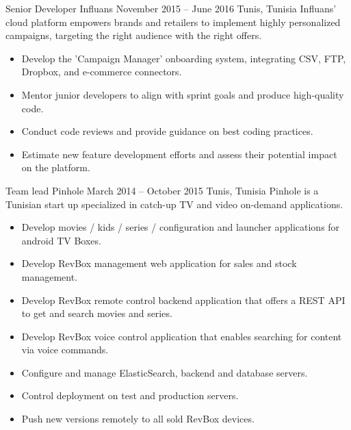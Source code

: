 \documentclass[10pt,a4paper]{resume-settings}
\begin{document}
\cvevent
    {Senior Developer}
    {Influans}
    {November 2015 -- June 2016}
    {Tunis, Tunisia}
    {Influans' cloud platform empowers brands and retailers to implement highly personalized campaigns, targeting the right audience with the right offers.}
    \begin{itemize}
        \item Develop the 'Campaign Manager' onboarding system, integrating CSV, FTP, Dropbox, and e-commerce connectors.
        \item Mentor junior developers to align with sprint goals and produce high-quality code.
        \item Conduct code reviews and provide guidance on best coding practices.
        \item Estimate new feature development efforts and assess their potential impact on the platform.
    \end{itemize}
\divider


\cvevent
    {Team lead}
    {Pinhole}
    {March 2014 -- October 2015}
    {Tunis, Tunisia}
    {Pinhole is a Tunisian start up specialized in catch-up TV and video on-demand applications.}
    \begin{itemize}
        \item Develop movies / kids / series / configuration and launcher applications for android TV Boxes.
        \item Develop RevBox management web application for sales and stock management.
        \item Develop RevBox remote control backend application that offers a REST API to get and search movies and series.
        \item Develop RevBox voice control application that enables searching for content via voice commands.
        \item Configure and manage ElasticSearch, backend and database servers.
        \item Control deployment on test and production servers.
        \item Push new versions remotely to all sold RevBox devices.
    \end{itemize}
\divider
\end{document}
